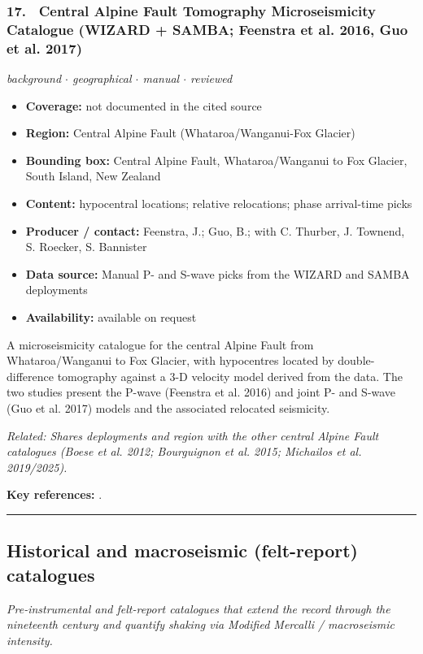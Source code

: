 \documentclass[10pt,a4paper]{article}
\newcommand{\catentryrule}{\par\vspace{3pt}\noindent\textcolor{rulegrey}{\rule{\linewidth}{0.3pt}}\par\vspace{5pt}}
\newcommand{\kv}[2]{\item \textbf{#1:} #2}
\begin{document}
\subsubsection*{\hypertarget{c:17}{17.}~ Central Alpine Fault Tomography Microseismicity Catalogue (WIZARD + SAMBA; Feenstra et al. 2016, Guo et al. 2017)}
{\small\itshape background $\cdot$ geographical $\cdot$ manual $\cdot$ reviewed}\par\vspace{2pt}
\begin{itemize}[leftmargin=1.3em,itemsep=0.6pt,topsep=1pt,parsep=0pt]
\kv{Coverage}{not documented in the cited source}
\kv{Region}{Central Alpine Fault (Whataroa/Wanganui-Fox Glacier)}
\kv{Bounding box}{Central Alpine Fault, Whataroa/Wanganui to Fox Glacier, South Island, New Zealand}
\kv{Content}{hypocentral locations; relative relocations; phase arrival-time picks}
\kv{Producer / contact}{Feenstra, J.; Guo, B.; with C. Thurber, J. Townend, S. Roecker, S. Bannister}
\kv{Data source}{Manual P- and S-wave picks from the WIZARD and SAMBA deployments}
\kv{Availability}{available on request}
\end{itemize}
\par\vspace{2pt}A microseismicity catalogue for the central Alpine Fault from Whataroa/Wanganui to Fox Glacier, with hypocentres located by double-difference tomography against a 3-D velocity model derived from the data. The two studies present the P-wave (Feenstra et al. 2016) and joint P- and S-wave (Guo et al. 2017) models and the associated relocated seismicity.
\par{\small\itshape Related: Shares deployments and region with the other central Alpine Fault catalogues (Boese et al. 2012; Bourguignon et al. 2015; Michailos et al. 2019/2025).}
\par\vspace{2pt}\textbf{Key references:} \cite{Feenstra2016,Guo2017}.
\catentryrule
\subsection{Historical and macroseismic (felt-report) catalogues}
\textit{Pre-instrumental and felt-report catalogues that extend the record through the nineteenth century and quantify shaking via Modified Mercalli / macroseismic intensity.}\par\vspace{4pt}
\end{document}
